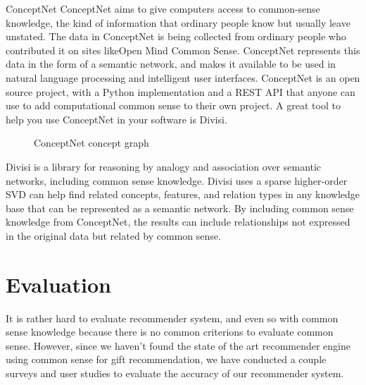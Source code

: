 \documentclass[11pt,twocolumn]{article}
\begin{document}
{\large ConceptNet}
ConceptNet aims to give computers access to common-sense knowledge, the kind of information that ordinary people know but usually leave unstated.
The data in ConceptNet is being collected from ordinary people who contributed it on sites likeOpen Mind Common Sense. ConceptNet represents this data in the form of a semantic network, and makes it available to be used in natural language processing and intelligent user interfaces.
ConceptNet is an open source project, with a Python implementation and a REST API that anyone can use to add computational common sense to their own project. A great tool to help you use ConceptNet in your software is Divisi.

\begin{figure}[h!t]
\caption{ConceptNet concept graph}
\label{graph}
\end{figure}


{\large Divisi}
is a library for reasoning by analogy and association over semantic networks, including common sense knowledge.
Divisi uses a sparse higher-order SVD can help find related concepts, features, and relation types in any knowledge base that can be represented as a semantic network. By including common sense knowledge from ConceptNet, the results can include relationships not expressed in the original data but related by common sense.


\section{Evaluation}
It is rather hard to evaluate recommender system, and even so with common sense knowledge because there is no
common criterions to evaluate common sense. However, since we haven't found the state of the art recommender engine
using common sense for gift recommendation, we have conducted a couple surveys and user studies to evaluate the accuracy
of our recommender system.
\end{document}
